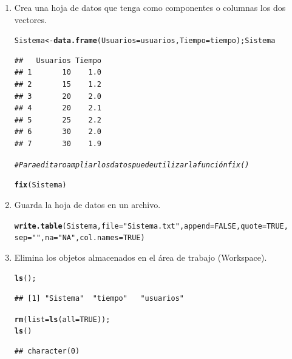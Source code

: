 \documentclass[12pt,letterpaper]{article}\usepackage[]{graphicx}\usepackage[]{color}
\makeatletter
\newcommand{\hlnum}[1]{\textcolor[rgb]{0.686,0.059,0.569}{#1}}%
\newcommand{\hlstr}[1]{\textcolor[rgb]{0.192,0.494,0.8}{#1}}%
\newcommand{\hlcom}[1]{\textcolor[rgb]{0.678,0.584,0.686}{\textit{#1}}}%
\newcommand{\hlstd}[1]{\textcolor[rgb]{0.345,0.345,0.345}{#1}}%
\newcommand{\hlkwb}[1]{\textcolor[rgb]{0.69,0.353,0.396}{#1}}%
\newcommand{\hlkwc}[1]{\textcolor[rgb]{0.333,0.667,0.333}{#1}}%
\newcommand{\hlkwd}[1]{\textcolor[rgb]{0.737,0.353,0.396}{\textbf{#1}}}%
\newenvironment{kframe}{%
 \def\at@end@of@kframe{}%
 \ifinner\ifhmode%
  \def\at@end@of@kframe{\end{minipage}}%
  \begin{minipage}{\columnwidth}%
 \fi\fi%
 \def\FrameCommand##1{\hskip\@totalleftmargin \hskip-\fboxsep
 \colorbox{shadecolor}{##1}\hskip-\fboxsep
     \hskip-\linewidth \hskip-\@totalleftmargin \hskip\columnwidth}%
 \MakeFramed {\advance\hsize-\width
   \@totalleftmargin\z@ \linewidth\hsize
   \@setminipage}}%
 {\par\unskip\endMakeFramed%
 \at@end@of@kframe}
\newenvironment{knitrout}{}{} %
\makeatother
\begin{document}
\begin{enumerate}
\item Crea una hoja de datos que tenga como componentes o columnas los dos vectores.

\begin{knitrout}
\color{fgcolor}\begin{kframe}
\begin{alltt}
\hlstd{Sistema} \hlkwb{<-} \hlkwd{data.frame}\hlstd{(}\hlkwc{Usuarios}\hlstd{=usuarios,} \hlkwc{Tiempo}\hlstd{=tiempo);Sistema}
\end{alltt}
\begin{verbatim}
##   Usuarios Tiempo
## 1       10    1.0
## 2       15    1.2
## 3       20    2.0
## 4       20    2.1
## 5       25    2.2
## 6       30    2.0
## 7       30    1.9
\end{verbatim}
\begin{alltt}
\hlcom{# Para editar o ampliar los datos puede utilizar la función fix() }

\hlkwd{fix}\hlstd{(Sistema)}
\end{alltt}
\end{kframe}
\end{knitrout}

\item Guarda la hoja de datos en un archivo. 

\begin{knitrout}
\color{fgcolor}\begin{kframe}
\begin{alltt}
\hlkwd{write.table}\hlstd{(Sistema,} \hlkwc{file}\hlstd{=}\hlstr{"Sistema.txt"}\hlstd{,} \hlkwc{append}\hlstd{=}\hlnum{FALSE}\hlstd{,} \hlkwc{quote}\hlstd{=}\hlnum{TRUE}\hlstd{,}
            \hlkwc{sep}\hlstd{=}\hlstr{" "}\hlstd{,} \hlkwc{na}\hlstd{=}\hlstr{"NA"}\hlstd{,} \hlkwc{col.names} \hlstd{=} \hlnum{TRUE}\hlstd{)}
\end{alltt}
\end{kframe}
\end{knitrout}

\item Elimina los objetos almacenados en el \'area de trabajo (Workspace).

\begin{knitrout}
\color{fgcolor}\begin{kframe}
\begin{alltt}
\hlkwd{ls}\hlstd{();}
\end{alltt}
\begin{verbatim}
## [1] "Sistema"  "tiempo"   "usuarios"
\end{verbatim}
\begin{alltt}
\hlkwd{rm}\hlstd{(}\hlkwc{list}\hlstd{=}\hlkwd{ls}\hlstd{(}\hlkwc{all}\hlstd{=}\hlnum{TRUE}\hlstd{));}
\hlkwd{ls}\hlstd{()}
\end{alltt}
\begin{verbatim}
## character(0)
\end{verbatim}
\end{kframe}
\end{knitrout}


\end{enumerate}
\end{document}
